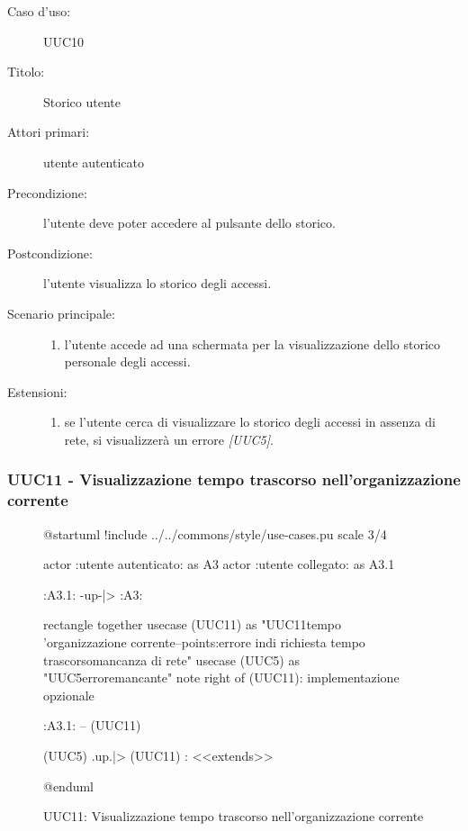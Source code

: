 \documentclass[casi-duso]{subfiles}
\begin{document}
\begin{description}
  \item[Caso d’uso:] UUC10
  \item[Titolo:] Storico utente
  \item[Attori primari:] utente autenticato
  \item[Precondizione:]  l'utente deve poter accedere al pulsante dello storico.
  \item[Postcondizione:] l'utente visualizza lo storico degli accessi.
  \item[Scenario principale:]
        \begin{enumerate}
          \item l'utente accede ad una schermata per la visualizzazione dello storico personale degli accessi.
        \end{enumerate}
  \item[Estensioni:]
        \begin{enumerate}
          \item se l'utente cerca di visualizzare lo storico degli accessi in assenza di rete, si visualizzerà un errore \emph{[UUC5]}.
        \end{enumerate}
\end{description}

\subsubsection{UUC11 - Visualizzazione tempo trascorso nell'organizzazione corrente}%
\label{subsub:UUC11utente}

\begin{figure}[h!]
  \centering
  \begin{plantuml}
  @startuml
  !include ../../commons/style/use-cases.pu
  scale 3/4

  actor :utente autenticato: as A3
  actor :utente collegato: as A3.1

  :A3.1: -up-|> :A3:

  rectangle {
    together {
      usecase (UUC11) as "UUC11\nVisualizzazione tempo \nnell'organizzazione corrente\n--\nExtension points:\nVisualizzazione errore in\ncaso di richiesta tempo trascorso\nin mancanza di rete"
      usecase (UUC5) as "UUC5\nVisualizzazione errore\nrete mancante"
      note right of (UUC11): implementazione opzionale
    }
  }

  :A3.1: -- (UUC11)

  (UUC5) .up.|> (UUC11) : <<extends>>

  @enduml
  \end{plantuml}
  \caption{UUC11: Visualizzazione tempo trascorso nell'organizzazione corrente}
  \label{fig:uuc11}
\end{figure}
\end{document}
